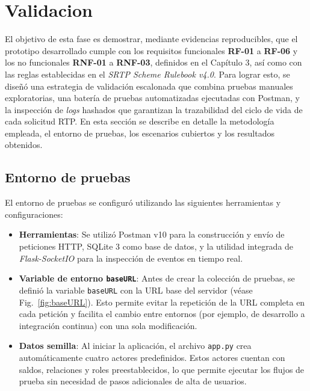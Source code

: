 \chapter{Validacion}
\label{sec:validacion}



El objetivo de esta fase es demostrar, mediante evidencias reproducibles, que el prototipo desarrollado cumple con los requisitos funcionales \textbf{RF-01} a \textbf{RF-06} y los no funcionales \textbf{RNF-01} a \textbf{RNF-03}, definidos en el Capítulo 3, así como con las reglas establecidas en el \textit{SRTP Scheme Rulebook v4.0}. Para lograr esto, se diseñó una estrategia de validación escalonada que combina pruebas manuales exploratorias, una batería de pruebas automatizadas ejecutadas con Postman, y la inspección de \textit{logs} hashados que garantizan la trazabilidad del ciclo de vida de cada solicitud RTP. En esta sección se describe en detalle la metodología empleada, el entorno de pruebas, los escenarios cubiertos y los resultados obtenidos.

\section{Entorno de pruebas}

El entorno de pruebas se configuró utilizando las siguientes herramientas y configuraciones:

\begin{itemize}
  \item \textbf{Herramientas}: Se utilizó Postman v10 para la construcción y envío de peticiones HTTP, SQLite 3 como base de datos, y la utilidad integrada de \textit{Flask-SocketIO} para la inspección de eventos en tiempo real.
  
  \item \textbf{Variable de entorno \texttt{baseURL}}: Antes de crear la colección de pruebas, se definió la variable \texttt{baseURL} con la URL base del servidor (véase Fig.~\ref{fig:baseURL}). Esto permite evitar la repetición de la URL completa en cada petición y facilita el cambio entre entornos (por ejemplo, de desarrollo a integración continua) con una sola modificación.
  
  \item \textbf{Datos semilla}: Al iniciar la aplicación, el archivo \texttt{app.py} crea automáticamente cuatro actores predefinidos. Estos actores cuentan con saldos, relaciones y roles preestablecidos, lo que permite ejecutar los flujos de prueba sin necesidad de pasos adicionales de alta de usuarios.
\end{itemize}

